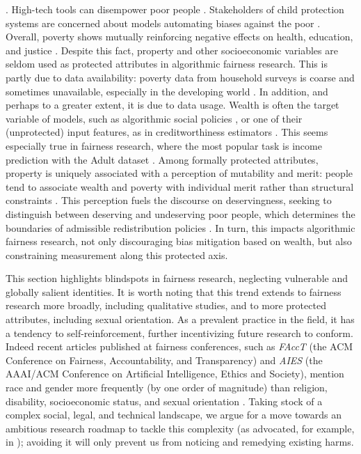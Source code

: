 . 
High-tech tools can disempower poor people \citep{eubanks2018automating,kirkpatrick2021algorithmic}. Stakeholders of child protection systems are concerned about models automating biases against the poor \citep{stapleton2022imagining}. Overall, poverty shows mutually reinforcing negative effects on health, education, and justice \citep{fuller2012poverty,parolin2022role,ladd2012education,rabuy2016detaining}. Despite this fact, property and other socioeconomic variables are seldom used as protected attributes in algorithmic fairness research. This is partly due to data availability: poverty data from household surveys is coarse and sometimes unavailable, especially in the developing world \citep{noriega2020algorithmic}. In addition, and perhaps to a greater extent, it is due to data usage. Wealth is often the target variable of models, such as algorithmic social policies \citep{noriega2020algorithmic,hanna2018universal}, or one of their (unprotected) input features, as in creditworthiness estimators \citep{das2023algorithmic}.  This seems especially true in fairness research, where the most popular task is income prediction with the Adult dataset \citep{fabris2022algorithmic}. Among formally protected attributes, property is uniquely associated with a perception of mutability and merit: people tend to associate wealth and poverty with individual merit rather than structural constraints \citep{heiserman2017higher,bucca2016merit}. This perception fuels the discourse on deservingness, seeking to distinguish between deserving and undeserving poor people, which determines the boundaries of admissible redistribution policies \citep{applebaum2001influence,watkins2016discourse}. In turn, this impacts algorithmic fairness research, not only discouraging bias mitigation based on wealth, but also constraining measurement along this protected axis.

This section highlights blindspots in fairness research, neglecting vulnerable and globally salient identities. It is worth noting that this trend extends to fairness research more broadly, including qualitative studies, and to more protected attributes, including sexual orientation. As a prevalent practice in the field, it has a tendency to self-reinforcement, further incentivizing future research to conform. Indeed recent articles published at fairness conferences, such as \textit{FAccT} (the ACM Conference on Fairness, Accountability, and Transparency) and \textit{AIES} (the AAAI/ACM Conference on Artificial Intelligence, Ethics and Society), mention race and gender more frequently (by one order of magnitude) than religion, disability, socioeconomic status, and sexual orientation \citep{birhane2022forgotten}. Taking stock of a complex social, legal, and technical landscape, we argue for a move towards an ambitious research roadmap to tackle this complexity (as advocated, for example, in \citet{guo2020toward}); avoiding it will only prevent us from noticing and remedying existing harms. 

